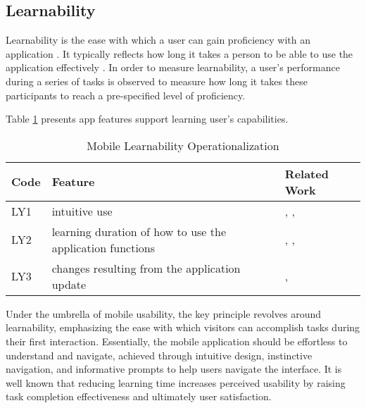 \documentclass[preprint,12pt]{elsarticle}
\begin{document}
\subsection{Learnability}
Learnability is the ease with which a user can gain proficiency with an application \cite{az2019evaluating}. 
It typically reflects how long it takes a person to be able to use the application effectively \cite{irwansyah2018radio}. In order to measure learnability, a user’s performance during a series of tasks is observed to measure how long it takes these participants to reach a pre-specified level of proficiency. 

Table \ref{tab:oper-learnability} presents app features support learning user's capabilities.
\begin{table}[h]
\caption{Mobile Learnability Operationalization}
\label{tab:oper-learnability}
\footnotesize
\begin{tabular}{|l|p{9cm}|p{2.5cm}|}
\hline
\textbf{Code} & \textbf{Feature}    & \textbf{Related Work} \\ \hline
LY1 & intuitive use  &  \cite{marsh2008design}, \cite{britton2013intuitive}, \cite{naumann2010benchmarks}      \\ \hline
LY2 & learning duration of how to use the application functions & \cite{liu2021case},  \cite{ramdowar2023comprehensive}, \cite{xiao2024design} \\ \hline
LY3 & changes resulting from the application update &  \cite{mathur2017impact}, \cite{huang2022updating}      \\ \hline
\end{tabular}
\end{table}

Under the umbrella of mobile usability, the key principle revolves around learnability, emphasizing the ease with which visitors can accomplish tasks during their first interaction. Essentially, the mobile application should be effortless to understand and navigate, achieved through intuitive design, instinctive navigation, and informative prompts to help users navigate the interface. 
It is well known that reducing learning time increases perceived usability by raising task completion effectiveness and ultimately user satisfaction.
\end{document}
